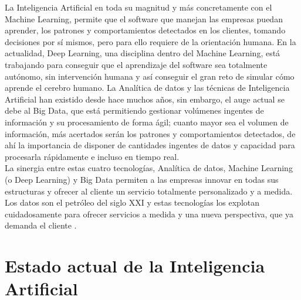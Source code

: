\documentclass[12pt,a4paper]{report}
\begin{document}
La Inteligencia Artificial en toda su magnitud y más concretamente con el Machine Learning, permite que el software que manejan las empresas puedan aprender, los patrones y comportamientos detectados en los clientes, tomando decisiones por sí mismos, pero para ello requiere de la orientación humana. En la actualidad, Deep Learning, una disciplina dentro del Machine Learning, está trabajando para conseguir que el aprendizaje del software sea totalmente autónomo, sin intervención humana y así conseguir el gran reto de simular cómo aprende el cerebro humano. La Analítica de datos y las técnicas de Inteligencia Artificial han existido desde hace muchos años, sin embargo, el auge actual se debe al Big Data, que está permitiendo gestionar volúmenes ingentes de información y su procesamiento de forma ágil; cuanto mayor sea el volumen de información, más acertados serán los patrones y comportamientos detectados, de ahí la importancia de disponer de cantidades ingentes de datos y capacidad para procesarla rápidamente e incluso en tiempo real.\\ La sinergia entre estas cuatro tecnologías, Analítica de datos, Machine Learning (o Deep Learning) y Big Data permiten a las empresas innovar en todas sus estructuras y ofrecer al cliente un servicio totalmente personalizado y a medida. Los datos son el petróleo del siglo XXI y estas tecnologías los explotan cuidadosamente para ofrecer servicios a medida y una nueva perspectiva, que ya demanda el cliente .

\section{Estado actual de la Inteligencia Artificial}
\end{document}
